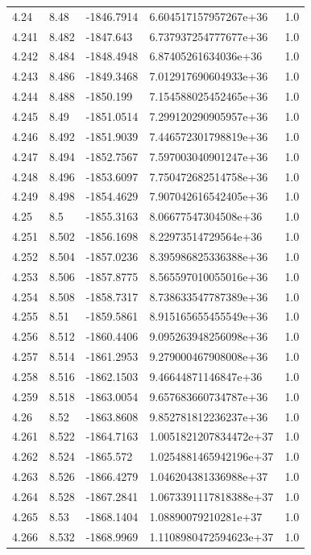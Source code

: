 \begin{tabular}{lllll}
4.24 & 8.48 & -1846.7914 & 6.604517157957267e+36 & 1.0 \\
4.241 & 8.482 & -1847.643 & 6.737937254777677e+36 & 1.0 \\
4.242 & 8.484 & -1848.4948 & 6.87405261634036e+36 & 1.0 \\
4.243 & 8.486 & -1849.3468 & 7.012917690604933e+36 & 1.0 \\
4.244 & 8.488 & -1850.199 & 7.154588025452465e+36 & 1.0 \\
4.245 & 8.49 & -1851.0514 & 7.299120290905957e+36 & 1.0 \\
4.246 & 8.492 & -1851.9039 & 7.446572301798819e+36 & 1.0 \\
4.247 & 8.494 & -1852.7567 & 7.597003040901247e+36 & 1.0 \\
4.248 & 8.496 & -1853.6097 & 7.750472682514758e+36 & 1.0 \\
4.249 & 8.498 & -1854.4629 & 7.907042616542405e+36 & 1.0 \\
4.25 & 8.5 & -1855.3163 & 8.06677547304508e+36 & 1.0 \\
4.251 & 8.502 & -1856.1698 & 8.22973514729564e+36 & 1.0 \\
4.252 & 8.504 & -1857.0236 & 8.395986825336388e+36 & 1.0 \\
4.253 & 8.506 & -1857.8775 & 8.565597010055016e+36 & 1.0 \\
4.254 & 8.508 & -1858.7317 & 8.738633547787389e+36 & 1.0 \\
4.255 & 8.51 & -1859.5861 & 8.915165655455549e+36 & 1.0 \\
4.256 & 8.512 & -1860.4406 & 9.095263948256098e+36 & 1.0 \\
4.257 & 8.514 & -1861.2953 & 9.279000467908008e+36 & 1.0 \\
4.258 & 8.516 & -1862.1503 & 9.46644871146847e+36 & 1.0 \\
4.259 & 8.518 & -1863.0054 & 9.657683660734787e+36 & 1.0 \\
4.26 & 8.52 & -1863.8608 & 9.852781812236237e+36 & 1.0 \\
4.261 & 8.522 & -1864.7163 & 1.0051821207834472e+37 & 1.0 \\
4.262 & 8.524 & -1865.572 & 1.0254881465942196e+37 & 1.0 \\
4.263 & 8.526 & -1866.4279 & 1.046204381336988e+37 & 1.0 \\
4.264 & 8.528 & -1867.2841 & 1.0673391117818388e+37 & 1.0 \\
4.265 & 8.53 & -1868.1404 & 1.08890079210281e+37 & 1.0 \\
4.266 & 8.532 & -1868.9969 & 1.1108980472594623e+37 & 1.0 \\

\end{tabular}
